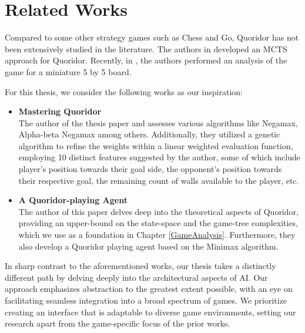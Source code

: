 \chapter{Related Works}\label{relatedworks}

Compared to some other strategy games such as Chess and Go, Quoridor has not been extensively studied in the literature. The authors in \citep{Brenner2015Artificial} developed an \gls{MCTS} approach for Quoridor. Recently, in \citep{Iwanaga2022Analysis}, the authors performed an analysis of the game for a miniature 5 by 5 board.

For this thesis, we consider the following works as our inspiration:

\begin{itemize}
    \item \textbf{Mastering Quoridor \citep{Glendenning2002MasteringQ}}\\
    The author of the thesis paper and assesses various algorithms like Negamax, Alpha-beta Negamax among others. Additionally, they utilized a genetic algorithm to refine the weights within a linear weighted evaluation function, employing 10 distinct features suggested by the author, some of which include player's position towards their goal side, the opponent's position towards their respective goal, the remaining count of walls available to the player, etc.

    \item \textbf{A Quoridor-playing Agent \citep{Mertens2006Quoridor}}\\
    The author of this paper delves deep into the theoretical aspects of Quoridor, providing an upper-bound on the state-space and the game-tree complexities, which we use as a foundation in Chapter \ref{GameAnalysis}.
    Furthermore, they also develop a Quoridor playing agent based on the Minimax algorithm.
    
\end{itemize}

In sharp contrast to the aforementioned works, our thesis takes a distinctly different path by delving deeply into the architectural aspects of AI. Our approach emphasizes abstraction to the greatest extent possible, with an eye on facilitating seamless integration into a broad spectrum of games. We prioritize creating an interface that is adaptable to diverse game environments, setting our research apart from the game-specific focus of the prior works.